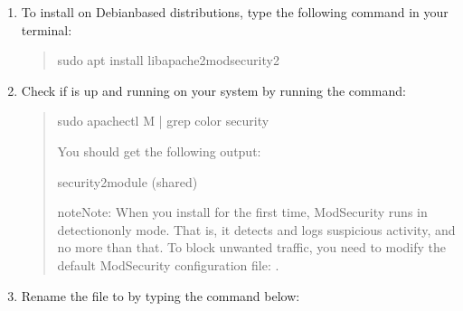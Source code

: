 \documentclass[letterpaper,10pt,english]{sphinxmanual}
\begin{document}
\begin{enumerate}
%
\item {} 
\sphinxAtStartPar
To install  on Debian\sphinxhyphen{}based distributions, type the following command in your terminal:
\begin{quote}

\begin{sphinxVerbatim}[commandchars=\\\{\}]
\PYGZdl{} sudo apt install lib\PYGZhy{}apache2\PYGZhy{}mod\PYGZhy{}security2
\end{sphinxVerbatim}
\end{quote}

\item {} 
\sphinxAtStartPar
Check if  is up and running on your system by running the command:
\begin{quote}

\begin{sphinxVerbatim}[commandchars=\\\{\}]
\PYGZdl{} sudo apachectl \PYGZhy{}M | grep \PYGZhy{}\PYGZhy{}color security
\end{sphinxVerbatim}

\sphinxAtStartPar
You should get the following output:

\begin{sphinxVerbatim}[commandchars=\\\{\}]
\PYGZdl{} security2\PYGZus{}module (shared)
\end{sphinxVerbatim}

\begin{sphinxadmonition}{note}{Note:}
\sphinxAtStartPar
When you install  for the first time, ModSecurity runs in detection\sphinxhyphen{}only mode. That is, it detects and logs suspicious activity, and no more than that. To block unwanted traffic, you need to modify the default ModSecurity configuration file: .
\end{sphinxadmonition}
\end{quote}

\item {} 
\sphinxAtStartPar
Rename the file  to  by typing the command below:
\begin{quote}


\end{quote}
\end{enumerate}
\end{document}
